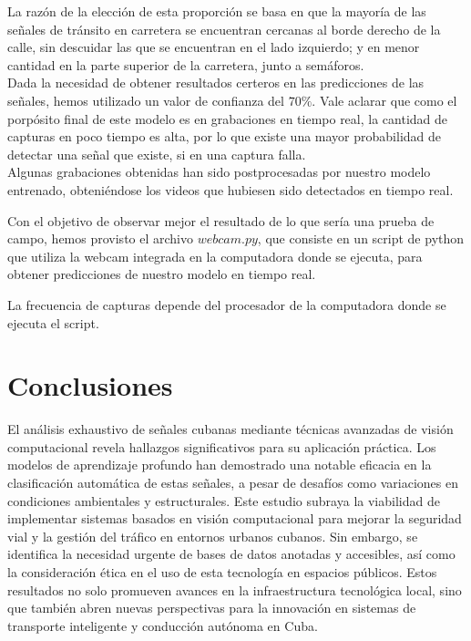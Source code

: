 \documentclass{article}
\begin{document}
La razón de la elección de esta proporción se basa en que la mayoría de las señales de tránsito en carretera se encuentran cercanas al borde derecho de la calle, sin descuidar las que se encuentran en el lado izquierdo; y en menor cantidad en la parte superior de la carretera, junto a semáforos.\\
Dada la necesidad de obtener resultados certeros en las predicciones de las señales, hemos utilizado un valor de confianza del $70\%$. Vale aclarar que como el porpósito final de este modelo es en grabaciones en tiempo real, la cantidad de capturas en poco tiempo es alta, por lo que existe una mayor probabilidad de detectar una señal que existe, si en una captura falla.\\
Algunas grabaciones obtenidas han sido postprocesadas por nuestro modelo entrenado, obteniéndose los videos que hubiesen sido detectados en tiempo real.

Con el objetivo de observar mejor el resultado de lo que sería una prueba de campo, hemos provisto el archivo $webcam.py$, que consiste en un script de python que utiliza la webcam integrada en la computadora donde se ejecuta, para obtener predicciones de nuestro modelo en tiempo real.

\begin{tcolorbox}
La frecuencia de capturas depende del procesador de la computadora donde se ejecuta el script.
\end{tcolorbox}

\section{Conclusiones}
El análisis exhaustivo de señales cubanas mediante técnicas avanzadas de visión computacional revela hallazgos significativos para su aplicación práctica. Los modelos de aprendizaje profundo han demostrado una notable eficacia en la clasificación automática de estas señales, a pesar de desafíos como variaciones en condiciones ambientales y estructurales. Este estudio subraya la viabilidad de implementar sistemas basados en visión computacional para mejorar la seguridad vial y la gestión del tráfico en entornos urbanos cubanos. Sin embargo, se identifica la necesidad urgente de bases de datos anotadas y accesibles, así como la consideración ética en el uso de esta tecnología en espacios públicos. Estos resultados no solo promueven avances en la infraestructura tecnológica local, sino que también abren nuevas perspectivas para la innovación en sistemas de transporte inteligente y conducción autónoma en Cuba.
\end{document}
